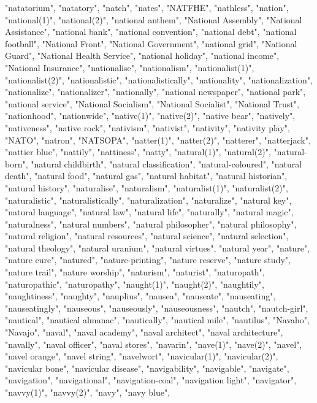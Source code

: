 "natatorium",
"natatory",
"natch",
"nates",
"NATFHE",
"nathless",
"nation",
"national(1)",
"national(2)",
"national anthem",
"National Assembly",
"National Assistance",
"national bank",
"national convention",
"national debt",
"national football",
"National Front",
"National Government",
"national grid",
"National Guard",
"National Health Service",
"national holiday",
"national income",
"National Insurance",
"nationalise",
"nationalism",
"nationalist(1)",
"nationalist(2)",
"nationalistic",
"nationalistically",
"nationality",
"nationalization",
"nationalize",
"nationalizer",
"nationally",
"national newspaper",
"national park",
"national service",
"National Socialism",
"National Socialist",
"National Trust",
"nationhood",
"nationwide",
"native(1)",
"native(2)",
"native bear",
"natively",
"nativeness",
"native rock",
"nativism",
"nativist",
"nativity",
"nativity play",
"NATO",
"natron",
"NATSOPA",
"natter(1)",
"natter(2)",
"natterer",
"natterjack",
"nattier blue",
"nattily",
"nattiness",
"natty",
"natural(1)",
"natural(2)",
"natural-born",
"natural childbirth",
"natural classification",
"natural-coloured",
"natural death",
"natural food",
"natural gas",
"natural habitat",
"natural historian",
"natural history",
"naturalise",
"naturalism",
"naturalist(1)",
"naturalist(2)",
"naturalistic",
"naturalistically",
"naturalization",
"naturalize",
"natural key",
"natural language",
"natural law",
"natural life",
"naturally",
"natural magic",
"naturalness",
"natural numbers",
"natural philosopher",
"natural philosophy",
"natural religion",
"natural resources",
"natural science",
"natural selection",
"natural theology",
"natural uranium",
"natural virtues",
"natural year",
"nature",
"nature cure",
"natured",
"nature-printing",
"nature reserve",
"nature study",
"nature trail",
"nature worship",
"naturism",
"naturist",
"naturopath",
"naturopathic",
"naturopathy",
"naught(1)",
"naught(2)",
"naughtily",
"naughtiness",
"naughty",
"nauplius",
"nausea",
"nauseate",
"nauseating",
"nauseatingly",
"nauseous",
"nauseously",
"nauseousness",
"nautch",
"nautch-girl",
"nautical",
"nautical almanac",
"nautically",
"nautical mile",
"nautilus",
"Navaho",
"Navajo",
"naval",
"naval academy",
"naval architect",
"naval architecture",
"navally",
"naval officer",
"naval stores",
"navarin",
"nave(1)",
"nave(2)",
"navel",
"navel orange",
"navel string",
"navelwort",
"navicular(1)",
"navicular(2)",
"navicular bone",
"navicular disease",
"navigability",
"navigable",
"navigate",
"navigation",
"navigational",
"navigation-coal",
"navigation light",
"navigator",
"navvy(1)",
"navvy(2)",
"navy",
"navy blue",

